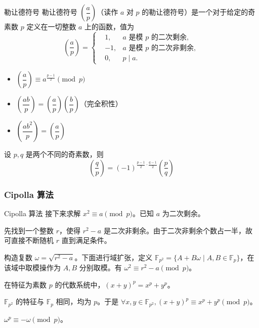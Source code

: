 \documentclass[../main.tex]{subfiles}
\begin{document}
\begin{frame}{勒让德符号}
勒让德符号 $\left(\dfrac{a}{p}\right)$（读作 $a$ 对 $p$ 的勒让德符号）是一个对于给定的奇素数 $p$ 定义在一切整数 $a$ 上的函数，值为
$$
\left(\frac{a}{p}\right)=
\left\{
\begin{aligned}
&1, & a \text{ 是模 } p \text{ 的二次剩余},\\
&-1, & a \text{ 是模 } p \text{ 的二次非剩余},\\
&0, & p\mid a.
\end{aligned}
\right.
$$
\end{frame}

\begin{frame}
\begin{theo}
\begin{itemize}
\item $\left(\dfrac{a}{p}\right)\equiv a^{\frac{p-1}{2}}\pmod p$ \pause
\item $\left(\dfrac{ab}{p}\right)=\left(\dfrac{a}{p}\right)\left(\dfrac{b}{p} \right)$（完全积性） \pause
\item $\left(\dfrac{ab^2}{p} \right)=\left(\dfrac{a}{p} \right)$ 
\end{itemize}
\end{theo}
\end{frame}

\begin{frame}
\begin{theo}[二次互反律]
设 $p,q$ 是两个不同的奇素数，则
$$
\left(\frac{q}{p} \right)=(-1)^{\frac{p-1}{2}\cdot\frac{q-1}{2}}\left(\frac{p}{q} \right)
$$
\end{theo}
\end{frame}

\subsubsection{Cipolla 算法}

\begin{frame}{Cipolla 算法}
接下来求解 $x^2\equiv a\pmod p$。已知 $a$ 为二次剩余。 \pause

先找到一个整数 $r$，使得 $r^2-a$ 是二次非剩余。由于二次非剩余个数占一半，故可直接不断随机 $r$ 直到满足条件。 \pause

构造复数 $\omega=\sqrt{r^2-a}$。下面进行域扩张，定义 $\mathbb{F}_{p^2}=\{A+B\omega\mid A,B\in\mathbb{F}_p \}$，在该域中取模操作为 $A,B$ 分别取模。有 $\omega^2\equiv r^2-a\pmod p$。
\end{frame}

\begin{frame}
\begin{theo}
在特征为素数 $p$ 的代数系统中，$(x+y)^p=x^p+y^p$。
\end{theo} \pause

$\mathbb{F}_{p^2}$ 的特征与 $\mathbb{F}_p$ 相同，均为 $p$。于是 $\forall x,y\in \mathbb{F}_{p^2},(x+y)^p\equiv x^p+y^p\pmod p$。 \pause

\begin{theo}
$\omega^p\equiv -\omega\pmod p$。
\end{theo}
\end{frame}
\end{document}
